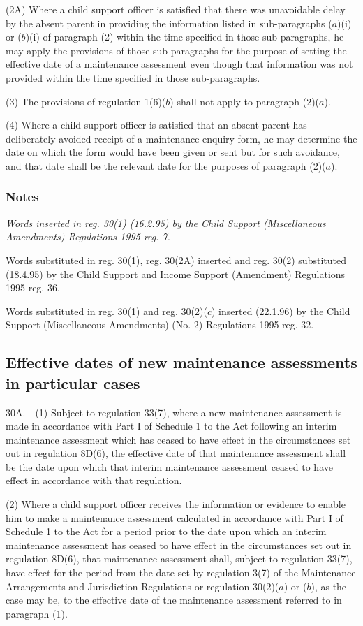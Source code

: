 \documentclass[a4paper]{article}
\newcommand\amendment[1]{\subsubsection*{Notes}{\itshape\frenchspacing\footnotesize #1 \par}}
\begin{document}
(2A) Where a child support officer is satisfied that there was unavoidable delay by the absent parent in providing the information listed in sub-paragraphs ($a$)(i) or ($b$)(i) of paragraph (2) within the time specified in those sub-paragraphs, he may apply the provisions of those sub-paragraphs for the purpose of setting the effective date of a maintenance assessment even though that information was not provided within the time specified in those sub-paragraphs.

(3) The provisions of regulation 1(6)($b$) shall not apply to paragraph (2)($a$).

(4) Where a child support officer is satisfied that an absent parent has deliberately avoided receipt of a maintenance enquiry form, he may determine the date on which the form would have been given or sent but for such avoidance, and that date shall be the relevant date for the purposes of paragraph (2)($a$).

\amendment{
Words inserted in reg. 30(1) (16.2.95) by the Child Support (Miscellaneous Amendments) Regulations 1995 reg. 7.

Words substituted in reg. 30(1), reg. 30(2A) inserted and reg. 30(2) substituted (18.4.95) by the Child Support and Income Support (Amendment) Regulations 1995 reg. 36.

Words substituted in reg. 30(1) and reg. 30(2)($c$) inserted (22.1.96) by the Child Support (Miscellaneous Amendments) (No. 2) Regulations 1995 reg. 32.
}

\subsection[30A. Effective dates of new maintenance assessments in particular cases]{Effective dates of new maintenance assessments in particular cases}

30A.—(1) Subject to regulation 33(7), where a new maintenance assessment is made in accordance with Part I of Schedule 1 to the Act following an interim maintenance assessment which has ceased to have effect in the circumstances set out in regulation 8D(6), the effective date of that maintenance assessment shall be the date upon which that interim maintenance assessment ceased to have effect in accordance with that regulation.

(2) Where a child support officer receives the information or evidence to enable him to make a maintenance assessment calculated in accordance with Part I of Schedule 1 to the Act for a period prior to the date upon which an interim maintenance assessment has ceased to have effect in the circumstances set out in regulation 8D(6), that maintenance assessment shall, subject to regulation 33(7), have effect for the period from the date set by regulation 3(7) of the Maintenance Arrangements and Jurisdiction Regulations or regulation 30(2)($a$) or ($b$), as the case may be, to the effective date of the maintenance assessment referred to in paragraph (1).
\end{document}
